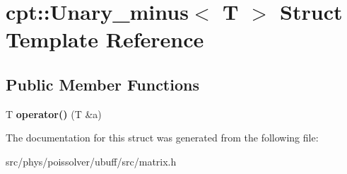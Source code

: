 \hypertarget{structcpt_1_1Unary__minus}{}\section{cpt\+:\+:Unary\+\_\+minus$<$ T $>$ Struct Template Reference}
\label{structcpt_1_1Unary__minus}
\subsection*{Public Member Functions}
\begin{DoxyCompactItemize}
\item 
T {\bfseries operator()} (T \&a)\hypertarget{structcpt_1_1Unary__minus_a2d20f4fee0a69ea840711536f25ec0d0}{}\label{structcpt_1_1Unary__minus_a2d20f4fee0a69ea840711536f25ec0d0}

\end{DoxyCompactItemize}


The documentation for this struct was generated from the following file\+:\begin{DoxyCompactItemize}
\item 
src/phys/poissolver/ubuff/src/matrix.\+h\end{DoxyCompactItemize}
